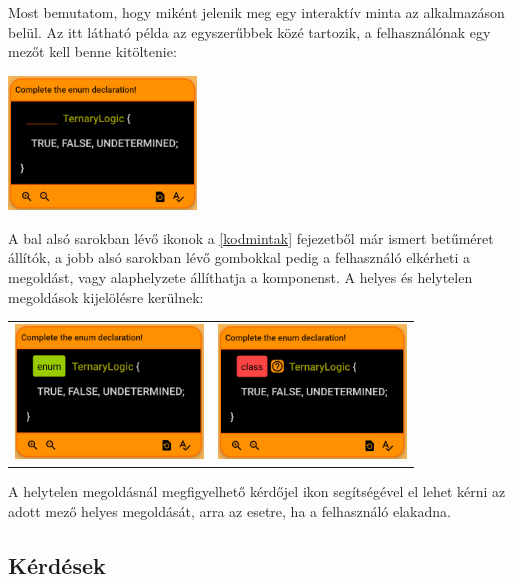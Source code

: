 \documentclass[12pt,a4paper]{article}
\begin{document}
	Most bemutatom, hogy miként jelenik meg egy interaktív minta az alkalmazáson belül. Az itt látható példa az egyszerűbbek közé tartozik, a felhasználónak egy mezőt kell benne kitöltenie:
	
	\bigskip
	\begin{center}
		\includegraphics[width=5cm]{interactive_not_completed}
	\end{center}
	\bigskip
	
	A bal alsó sarokban lévő ikonok a \ref{kodmintak} fejezetből már ismert betűméret állítók, a jobb alsó sarokban lévő gombokkal pedig a felhasználó elkérheti a megoldást, vagy alaphelyzete állíthatja a komponenst. A helyes és helytelen megoldások kijelölésre kerülnek:
	
	\bigskip
	\begin{center}
		\begin{tabular}{c c}
			\includegraphics[width=5cm]{interactive_correct}
			&
			\includegraphics[width=5cm]{interactive_incorrect}
		\end{tabular}
	\end{center}
	\bigskip
	
	A helytelen megoldásnál megfigyelhető kérdőjel ikon segítségével el lehet kérni az adott mező helyes megoldását, arra az esetre, ha a felhasználó elakadna.
	
	\subsection{Kérdések}\label{kerdesek}
	
\end{document}
